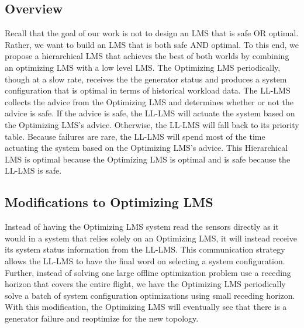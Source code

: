 \documentclass{acm_proc_article-sp}
\begin{document}
\subsection{Overview}
Recall that the goal of our work is not to design an LMS that is safe OR optimal. 
Rather, we want to build an LMS that is both safe AND optimal. 
To this end, we propose a hierarchical LMS that achieves the best of both worlds by combining an optimizing LMS with a low level LMS. The Optimizing LMS periodically, though at a slow rate, receives the the generator status and produces a system configuration that is optimal in terms of historical workload data. 
The LL-LMS collects the advice from the Optimizing LMS and determines whether or not the advice is safe. 
If the advice is safe, the LL-LMS will actuate the system based on the Optimizing LMS's advice. 
Otherwise, the LL-LMS will fall back to its priority table. 
Because failures are rare, the LL-LMS will spend most of the time actuating the system based on the Optimizing LMS's advice. 
This Hierarchical LMS is optimal because the Optimizing LMS is optimal and is safe because the LL-LMS is safe.

\subsection{Modifications to Optimizing LMS}
Instead of having the Optimizing LMS system read the sensors directly as it would in a system that relies solely on an Optimizing LMS, it will instead receive its system status information from the LL-LMS. 
This communication strategy allows the LL-LMS to have the final word on selecting a system configuration.
Further, instead of solving one large offline optimization problem use a receding horizon that covers the entire flight, we have the Optimizing LMS periodically solve a batch of system configuration optimizations using small receding horizon.
With this modification, the Optimizing LMS will eventually see that there is a generator failure and reoptimize for the new topology.
\end{document}
